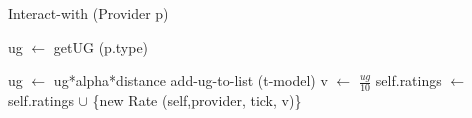 \begin{algorithm}[H]
\caption{Interact-with (Provider p)}

\begin{algorithmic}
\STATE ug $\leftarrow$ getUG (p.type)

\STATE ug $\leftarrow$ ug*alpha*distance
\ENDIF
\STATE add-ug-to-list (t-model)
\STATE v $\leftarrow$ $\frac{ug}{10}$
\STATE self.ratings $\leftarrow$ self.ratings $\cup$ \{new Rate (self,provider, tick, v)\}

\end{algorithmic}
\end{algorithm}
